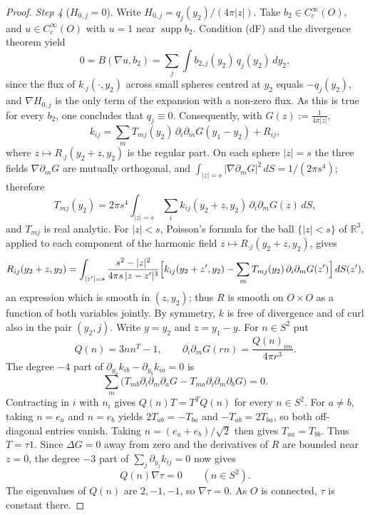 \documentclass[11pt,letterpaper,reqno]{amsart}
\theoremstyle{definition}
\begin{document}
\begin{proof}
\emph{Step 4} ($H_{0,j}=0$).
Write $H_{0,j}=q_j(y_2)/(4\pi|z|)$.
Take $b_2\in C_c^\infty(O)$, and $u\in C_c^\infty(O)$ with $u=1$ near $\operatorname{supp}b_2$.
Condition (dF) and the divergence theorem yield
\begin{equation*}
0=B(\nabla u,b_2)=\sum_j\int b_{2,j}(y_2)\,q_j(y_2)\,dy_2,
\end{equation*}
since the flux of $k_{\cdot j}(\cdot,y_2)$ across small spheres centred at $y_2$ equals $-q_j(y_2)$, and $\nabla H_{0,j}$ is the only term of the expansion with a non-zero flux.
As this is true for every $b_2$, one concludes that $q_j\equiv0$.
Consequently, with $G(z):=\frac1{4\pi|z|}$,
\begin{equation*}
k_{ij}=\sum_mT_{mj}(y_2)\,\partial_i\partial_mG(y_1-y_2)+R_{ij},
\end{equation*}
where $z\mapsto R_{\cdot j}(y_2+z,y_2)$ is the regular part.
On each sphere $|z|=s$ the three fields $\nabla\partial_mG$ are mutually orthogonal, and $\int_{|z|=s}|\nabla\partial_mG|^2\,dS=1/(2\pi s^4)$; therefore
\begin{equation*}
T_{mj}(y_2)=2\pi s^4\int_{|z|=s}\sum_ik_{ij}(y_2+z,y_2)\,\partial_i\partial_mG(z)\,dS,
\end{equation*}
and $T_{mj}$ is real analytic.
For $|z|<s$, Poisson's formula for the ball $\{|z|<s\}$ of $\mathbb R^3$, applied to each component of the harmonic field $z\mapsto R_{\cdot j}(y_2+z,y_2)$, gives
\begin{equation*}
R_{ij}(y_2+z,y_2)=\int_{|z'|=s}\frac{s^2-|z|^2}{4\pi s\,|z-z'|^3}\Bigl[k_{ij}(y_2+z',y_2)-\sum_mT_{mj}(y_2)\,\partial_i\partial_mG(z')\Bigr]\,dS(z'),
\end{equation*}
an expression which is smooth in $(z,y_2)$; thus $R$ is smooth on $O\times O$ as a function of both variables jointly.
By symmetry, $k$ is free of divergence and of curl also in the pair $(y_2,j)$.
Write $y=y_2$ and $z=y_1-y$. For $n\in S^2$ put
\[
Q(n)=3nn^T-1,\qquad
\partial_i\partial_mG(rn)=\frac{Q(n)_{im}}{4\pi r^3}.
\]
The degree $-4$ part of
$\partial_{y_a}k_{ib}-\partial_{y_b}k_{ia}=0$ is
\[
\sum_m\bigl(T_{mb}\partial_i\partial_m\partial_aG
             -T_{ma}\partial_i\partial_m\partial_bG\bigr)=0.
\]
Contracting in $i$ with $n_i$ gives
$Q(n)T=T^TQ(n)$ for every $n\in S^2$.
For $a\ne b$, taking $n=e_a$ and $n=e_b$ yields
$2T_{ab}=-T_{ba}$ and $-T_{ab}=2T_{ba}$, so both off-diagonal entries vanish.
Taking $n=(e_a+e_b)/\sqrt2$ then gives $T_{aa}=T_{bb}$.
Thus $T=\tau1$.
Since $\Delta G=0$ away from zero and the derivatives of $R$ are bounded near $z=0$, the degree $-3$ part of
$\sum_j\partial_{y_j}k_{ij}=0$ now gives
\[
Q(n)\nabla\tau=0\qquad(n\in S^2).
\]
The eigenvalues of $Q(n)$ are $2,-1,-1$, so $\nabla\tau=0$.
As $O$ is connected, $\tau$ is constant there.


\end{proof}
\end{document}

